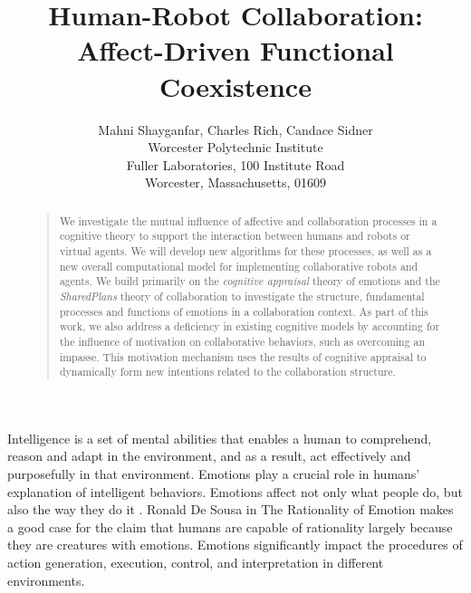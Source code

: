 \documentclass[letterpaper]{article}
\begin{document}
%
\title{Human-Robot Collaboration: Affect-Driven Functional Coexistence}
\author{Mahni Shayganfar, Charles Rich, Candace Sidner\\
Worcester Polytechnic Institute\\
Fuller Laboratories, 100 Institute Road\\
Worcester, Massachusetts, 01609\\
}
\maketitle
\begin{abstract}
\begin{quote}
We investigate the mutual influence of affective and collaboration processes in
a cognitive theory to support the interaction between humans and robots or
virtual agents. We will develop new algorithms for these processes, as well as a
new overall computational model for implementing collaborative robots and
agents. We build primarily on the \textit{cognitive appraisal} theory of
emotions \cite{gratch:domain-independent} and the \textit{SharedPlans} theory
\cite{grosz:plans-discourse} of collaboration to investigate the structure,
fundamental processes and functions of emotions in a collaboration context. As
part of this work, we also address a deficiency in existing cognitive models by
accounting for the influence of motivation on collaborative behaviors, such as
overcoming an impasse. This motivation mechanism uses the results of cognitive
appraisal to dynamically form new intentions related to the collaboration
structure.
\end{quote}
\end{abstract}

Intelligence is a set of mental abilities that enables a human to comprehend,
reason and adapt in the environment, and as a result, act effectively and
purposefully in that environment. Emotions play a crucial role in humans'
explanation of intelligent behaviors. Emotions affect not only what people do,
but also the way they do it \cite{cowie:concepts-definitions}. Ronald De Sousa
in The Rationality of Emotion \cite{sousa:rationality-emotion} makes a good case
for the claim that humans are capable of rationality largely because they are
creatures with emotions. Emotions significantly impact the procedures of action
generation, execution, control, and interpretation \cite{zhu:emotion-action} in
different environments. 
\end{document}
